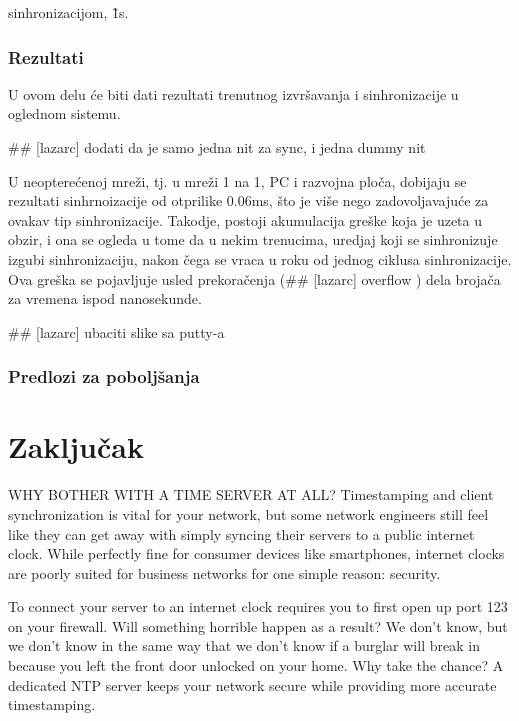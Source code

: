 \documentclass[a4paper,12pt, master]{etf}
\begin{document}
        sinhronizacijom, \~1s.

        \subsection{Rezultati}

		U ovom delu \'{c}e biti dati rezultati trenutnog izvr\v{s}avanja i sinhronizacije 
		u oglednom sistemu.

        \#\# [lazarc] dodati da je samo jedna nit za sync, i jedna dummy nit

		U neoptere\'{c}enoj mre\v{z}i, tj\@. u mre\v{z}i 1 na 1, PC i razvojna plo\v{c}a, 
		dobijaju se rezultati sinhrnoizacije od otprilike 0.06ms, \v{s}to je vi\v{s}e nego 
		zadovoljavaju\'{c}e za ovakav tip sinhronizacije. Takodje, postoji akumulacija gre\v{s}ke 
		koja je uzeta u obzir, i ona se ogleda u tome da u nekim trenucima, uredjaj koji se
		sinhronizuje izgubi sinhronizaciju, nakon \v{c}ega se vraca u roku od jednog ciklusa 
		sinhronizacije. Ova gre\v{s}ka se pojavljuje usled prekora\v{c}enja (\#\# [lazarc] overflow ) 
		dela broja\v{c}a za vremena ispod nanosekunde.

        \#\# [lazarc] ubaciti slike sa putty-a

		\subsection{Predlozi za pobolj\v{s}anja}
		


	\newpage

	\chapter{Zaključak}

	WHY BOTHER WITH A TIME SERVER AT ALL\@?
	Timestamping and client synchronization is vital for your network, but some network
	engineers still feel like they can get away with simply syncing their servers to a public
	internet clock. While perfectly fine for consumer devices like smartphones, internet
	clocks are poorly suited for business networks for one simple reason: security.

	To connect your server to an internet clock requires you to first open up port 123 on
	your firewall. Will something horrible happen as a result? We don't know, but we don't
	know in the same way that we don't know if a burglar will break in because you left the
	front door unlocked on your home. Why take the chance? A dedicated NTP server keeps your
	network secure while providing more accurate timestamping.
\end{document}
